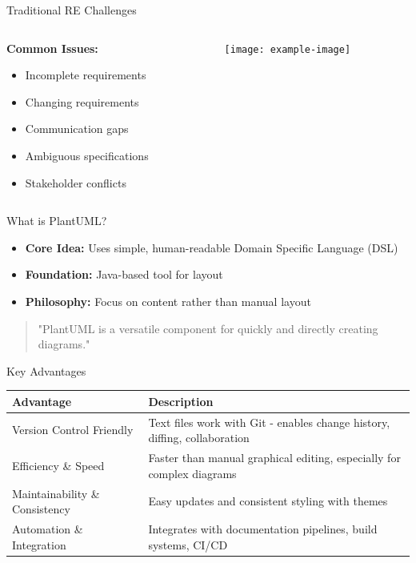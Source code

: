 \documentclass{beamer}
\begin{document}
\begin{frame}{Traditional RE Challenges}
    \begin{columns}
        \begin{column}{0.5\textwidth}
            \textbf{Common Issues:}
            \begin{itemize}
                \item Incomplete requirements
                \item Changing requirements
                \item Communication gaps
                \item Ambiguous specifications
                \item Stakeholder conflicts
            \end{itemize}
        \end{column}
        \begin{column}{0.5\textwidth}
            \centering
            \texttt{[image: example-image]} %
        \end{column}
    \end{columns}
\end{frame}

\begin{frame}{What is PlantUML?}
    \begin{itemize}
        \item \textbf{Core Idea:} Uses simple, human-readable Domain Specific Language (DSL)
        \item \textbf{Foundation:} Java-based tool for layout
        \item \textbf{Philosophy:} Focus on content rather than manual layout
    \end{itemize}
    
    \begin{quote}
        "PlantUML is a versatile component for quickly and directly creating diagrams."
    \end{quote}
\end{frame}

\begin{frame}{Key Advantages}
    \begin{table}
    \small
    \begin{tabular}{p{} p{}}
    \textbf{Advantage} & \textbf{Description} \\
    \hline
    Version Control Friendly & Text files work with Git - enables change history, diffing, collaboration \\
    Efficiency \& Speed & Faster than manual graphical editing, especially for complex diagrams \\
    Maintainability \& Consistency & Easy updates and consistent styling with themes \\
    Automation \& Integration & Integrates with documentation pipelines, build systems, CI/CD \\
    \end{tabular}
    \end{table}
\end{frame}
\end{document}
